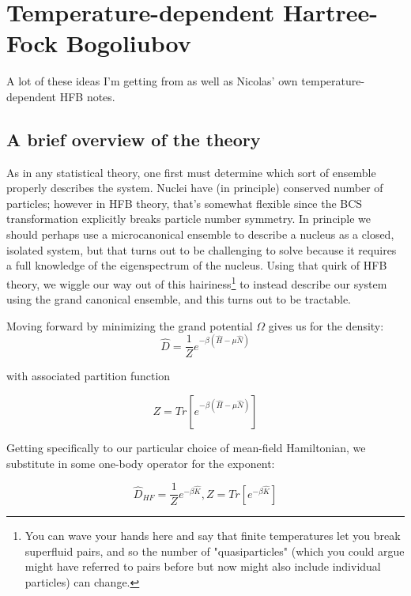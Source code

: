\chapter{Temperature-dependent Hartree-Fock Bogoliubov}

A lot of these ideas I'm getting from \cite{Schunck2015} as well as Nicolas' own temperature-dependent HFB notes.

\section*{A brief overview of the theory}

As in any statistical theory, one first must determine which sort of ensemble properly describes the system. Nuclei have (in principle) conserved number of particles; however in HFB theory, that's somewhat flexible since the BCS transformation explicitly breaks particle number symmetry. In principle we should perhaps use a microcanonical ensemble to describe a nucleus as a closed, isolated system, but that turns out to be challenging to solve because it requires a full knowledge of the eigenspectrum of the nucleus. Using that quirk of HFB theory, we wiggle our way out of this hairiness\footnote{You can wave your hands here and say that finite temperatures let you break superfluid pairs, and so the number of "quasiparticles" (which you could argue might have referred to pairs before but now might also include individual particles) can change.} to instead describe our system using the grand canonical ensemble, and this turns out to be tractable.

Moving forward by minimizing the grand potential $\Omega$ gives us for the density:
\begin{equation*}
\hat{D} = \frac{1}{Z}e^{-\beta\left(\hat{H}-\mu\hat{N}\right)}
\end{equation*}

\noindent with associated partition function

\begin{equation*}
Z = Tr\left[e^{-\beta\left(\hat{H}-\mu\hat{N}\right)}\right]
\end{equation*}

Getting specifically to our particular choice of mean-field Hamiltonian, we substitute in some one-body operator for the exponent:

\begin{equation*}
\hat{D}_{HF} = \frac{1}{Z}e^{-\beta\hat{K}}, Z = Tr\left[e^{-\beta\hat{K}}\right]
\end{equation*}

